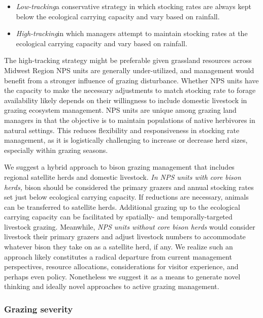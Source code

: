 \begin{itemize}
	\item \emph{Low-tracking}\textemdash a conservative strategy in which stocking rates are always kept below the ecological carrying capacity and vary based on rainfall.
	\item \emph{High-tracking}\textemdash in which managers attempt to maintain stocking rates at the ecological carrying capacity and vary based on rainfall.
\end{itemize}

The high-tracking strategy might be preferable given grassland resources across Midwest Region NPS units are generally under-utilized, and management would benefit from a stronger influence of grazing disturbance. 
Whether NPS units have the capacity to make the necessary adjustments to match stocking rate to forage availability likely depends on their willingness to include domestic livestock in grazing ecosystem management. 
NPS units are unique among grazing land managers in that the objective is to maintain populations of native herbivores in natural settings. 
This reduces flexibility and responsiveness in stocking rate management, as it is logistically challenging to increase or decrease herd sizes, especially within grazing seasons. 

We suggest a hybrid approach to bison grazing management that includes regional satellite herds and domestic livestock. 
\emph{In NPS units with core bison herds,} bison should be considered the primary grazers and annual stocking rates set just below ecological carrying capacity. 
If reductions are necessary, animals can be transferred to satellite herds. 
Additional grazing up to the ecological carrying capacity can be facilitated by spatially- and temporally-targeted livestock grazing. 
Meanwhile, \emph{NPS units without core bison herds} would consider livestock their primary grazers and adjust livestock numbers to accommodate whatever bison they take on as a satellite herd, if any. 
We realize such an approach likely constitutes a radical departure from current management perspectives, resource allocations, considerations for visitor experience, and perhaps even policy. 
Nonetheless we suggest it as a means to generate novel thinking and ideally novel approaches to active grazing management. 
 

\subsubsection{Grazing severity} 

